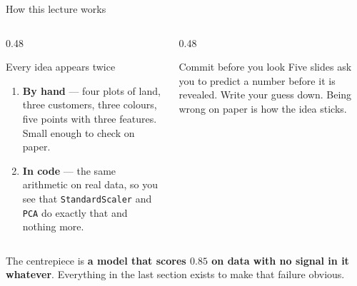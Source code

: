 \documentclass[aspectratio=169]{beamer}
\begin{document}
\begin{frame}[shrink=6]{How this lecture works}
  \begin{columns}[T]
    \begin{column}{0.48\textwidth}
      \begin{block}{Every idea appears twice}
        \begin{enumerate}
          \item \textbf{By hand} --- four plots of land, three customers,
            three colours, five points with three features. Small enough to
            check on paper.
          \item \textbf{In code} --- the same arithmetic on real data, so you
            see that \texttt{StandardScaler} and \texttt{PCA} do exactly that
            and nothing more.
        \end{enumerate}
      \end{block}
    \end{column}
    \begin{column}{0.48\textwidth}
      \begin{alertblock}{Commit before you look}
        Five slides ask you to predict a number before it is revealed. Write
        your guess down. Being wrong on paper is how the idea sticks.
      \end{alertblock}
    \end{column}
  \end{columns}
  \vspace{0.4em}
  \begin{center}
    \small The centrepiece is \textbf{a model that scores $0.85$ on data with
    no signal in it whatever}. Everything in the last section exists to make
    that failure obvious.
  \end{center}
\end{frame}
\end{document}
